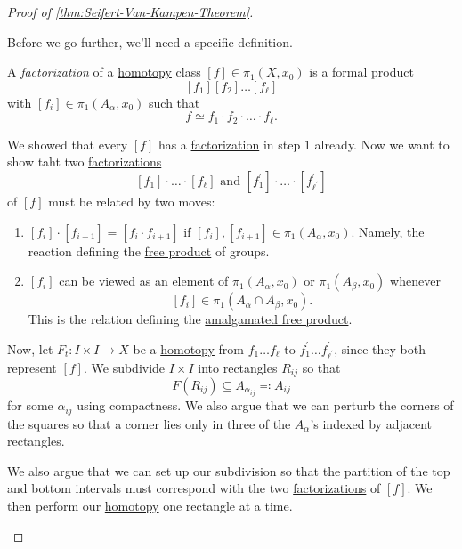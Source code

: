 \begin{proof}[Proof of \autoref{thm:Seifert-Van-Kampen-Theorem}]
\begin{enumerate}
		      Before we go further, we'll need a specific definition.
		      \begin{definition}[Factorization]\label{def:factorization}
			      A \emph{factorization} of a \hyperref[def:homotopy]{homotopy} class \([f]\in \pi _1(X, x_{0})\) is a formal product
			      \[
				      [f_1][f_2]\ldots [f_{\ell }]
			      \]
			      with \([f_{i}]\in \pi _1(A_\alpha , x_0)\) such that
			      \[
				      f\simeq f_1\cdot f_2\cdot\ldots \cdot f_{\ell}.
			      \]
		      \end{definition}
		      We showed that every \([f]\) has a \hyperref[def:factorization]{factorization} in step \(1\) already. Now we want to show taht
		      two \hyperref[def:factorization]{factorizations}
		      \[
			      [f_{1}]\cdot \ldots \cdot[f_{\ell }] \text{ and } [f_{1} ^\prime ]\cdot \ldots \cdot[f_{\ell ^\prime } ^\prime ]
		      \]
		      of \([f]\) must be related by two moves:
		      \begin{enumerate}[(1)]
			      \item \([f_{i}]\cdot[f_{i+1}] = [f_{i}\cdot f_{i+1}]\) if \([f_{i}], [f_{i+1}]\in \pi _1(A_\alpha , x_0)\). Namely, the reaction
			            defining the \hyperref[def:free-product-with-amalgamation]{free product} of groups.
			      \item \([f_{i}]\) can be viewed as an element of \(\pi _1(A_\alpha , x_{0})\) or \(\pi _1(A_\beta , x_0)\) whenever
			            \[
				            [f_{i}]\in \pi _1(A_\alpha \cap A_\beta , x_{0}).
			            \]
			            This is the relation defining the \hyperref[def:free-product-with-amalgamation]{amalgamated free product}.
		      \end{enumerate}
		      Now, let \(F_{t}\colon I\times I\to X\) be a \hyperref[def:homotopy]{homotopy} from \(f_1 \ldots f_{\ell } \) to
		      \(f_1 ^\prime \ldots f ^\prime _{\ell ^\prime } \), since they both represent \([f]\). We subdivide \(I\times I\) into
		      rectangles \(R_{ij}\) so that
		      \[
			      F(R_{ij})\subseteq A_{\alpha _{ij}}\eqqcolon A_{ij}
		      \]
		      for some \(\alpha _{ij}\) using compactness. We also argue that we can perturb the corners of the squares so that a corner
		      lies only in three of the \(A_\alpha \)'s indexed by adjacent rectangles.
		      \begin{figure}[H]
			      \centering
			      \label{fig:pf:Seifert-Van-Kampen-thm-1}
		      \end{figure}
		      We also argue that we can set up our subdivision so that the partition of the top and bottom intervals must correspond with the
		      two \hyperref[def:factorization]{factorizations} of \([f]\). We then perform our \hyperref[def:homotopy]{homotopy} one
		      rectangle at a time.
		      \begin{figure}[H]
			      \centering
			      \label{fig:pf:Seifert-Van-Kampen-thm-2}
		      \end{figure}

\end{enumerate}
\end{proof}
